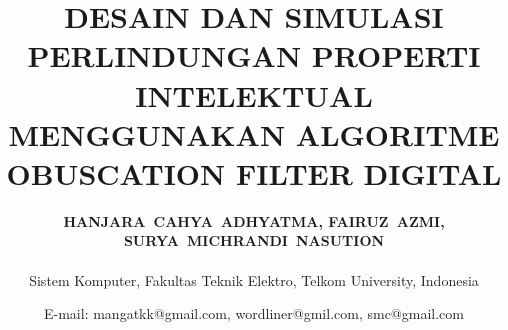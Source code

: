 \title{\vspace{-2.0cm} \textbf{DESAIN DAN SIMULASI PERLINDUNGAN PROPERTI INTELEKTUAL MENGGUNAKAN ALGORITME OBUSCATION FILTER DIGITAL}}
\author{\fontsize{10pt}{10pt}\textbf{
		HANJARA~CAHYA~ADHYATMA, FAIRUZ~AZMI, SURYA~MICHRANDI~NASUTION
	}\\
	\vspace{0.5pt}\\
	Sistem Komputer, Fakultas Teknik Elektro, Telkom University, Indonesia\\
}
\date{E-mail: mangatkk@gmail.com, wordliner@gmil.com, smc@gmail.com}